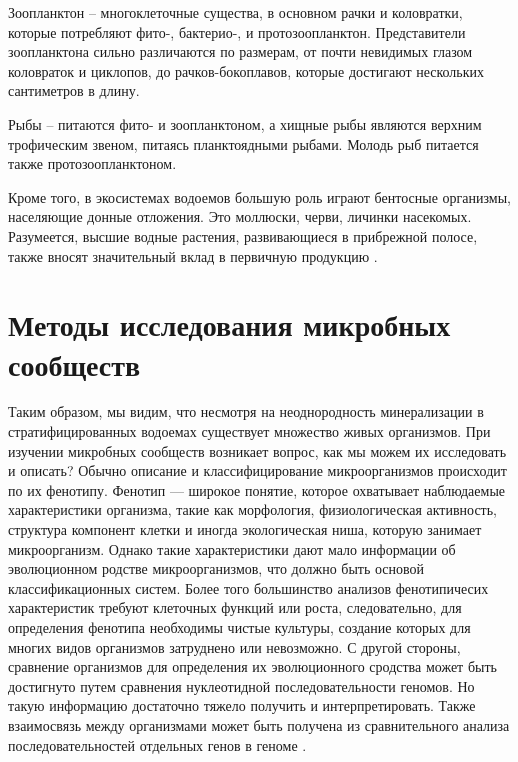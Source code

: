 Зоопланктон – многоклеточные существа, в основном рачки и коловратки, которые потребляют фито-, бактерио-, и протозоопланктон. Представители зоопланктона сильно различаются по размерам, от почти невидимых глазом коловраток и циклопов, до рачков-бокоплавов, которые достигают нескольких сантиметров в длину.

Рыбы – питаются фито- и зоопланктоном, а хищные рыбы являются верхним трофическим звеном, питаясь планктоядными рыбами. Молодь рыб питается также протозоопланктоном.

Кроме того, в экосистемах водоемов большую роль играют бентосные организмы, населяющие донные отложения. Это моллюски, черви, личинки насекомых. Разумеется, высшие
водные растения, развивающиеся в прибрежной полосе, также вносят значительный вклад
в первичную продукцию \cite{BioPhys10}.

\section{Методы исследования микробных сообществ}
Таким образом, мы видим, что несмотря на неоднородность минерализации в стратифицированных водоемах существует множество живых организмов. При изучении микробных
сообществ возникает вопрос, как мы можем их исследовать и описать? Обычно описание и
классифицирование микроорганизмов происходит по их фенотипу. Фенотип — широкое понятие, которое охватывает наблюдаемые характеристики организма, такие как морфология,
физиологическая активность, структура компонент клетки и иногда экологическая ниша,
которую занимает микроорганизм. Однако такие характеристики дают мало информации об
эволюционном родстве микроорганизмов, что должно быть основой классификационных систем. Более того большинство анализов фенотипичесих характеристик требуют клеточных
функций или роста, следовательно, для определения фенотипа необходимы чистые культуры, создание которых для многих видов организмов затруднено или невозможно. С другой
стороны, сравнение организмов для определения их эволюционного сродства может быть
достигнуто путем сравнения нуклеотидной последовательности геномов. Но такую информацию достаточно тяжело получить и интерпретировать. Также взаимосвязь между организмами может быть получена из сравнительного анализа последовательностей отдельных
генов в геноме \cite{Hugenholtz1996}.

